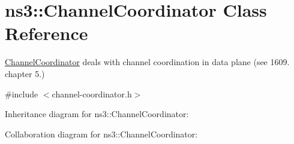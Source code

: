 \hypertarget{classns3_1_1ChannelCoordinator}{}\section{ns3\+:\+:Channel\+Coordinator Class Reference}
\label{classns3_1_1ChannelCoordinator}


\hyperlink{classns3_1_1ChannelCoordinator}{Channel\+Coordinator} deals with channel coordination in data plane (see 1609. chapter 5.)  




{\ttfamily \#include $<$channel-\/coordinator.\+h$>$}



Inheritance diagram for ns3\+:\+:Channel\+Coordinator\+:


Collaboration diagram for ns3\+:\+:Channel\+Coordinator\+:
